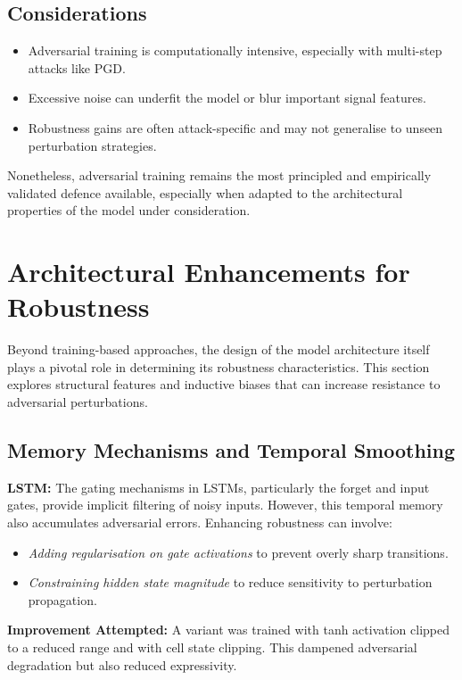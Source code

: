 \subsection{Considerations}

\begin{itemize}
    \item Adversarial training is computationally intensive, especially with multi-step attacks like PGD.
    \item Excessive noise can underfit the model or blur important signal features.
    \item Robustness gains are often attack-specific and may not generalise to unseen perturbation strategies.
\end{itemize}

Nonetheless, adversarial training remains the most principled and empirically validated defence available, especially when adapted to the architectural properties of the model under consideration.

\section{Architectural Enhancements for Robustness}

Beyond training-based approaches, the design of the model architecture itself plays a pivotal role in determining its robustness characteristics. This section explores structural features and inductive biases that can increase resistance to adversarial perturbations.

\subsection{Memory Mechanisms and Temporal Smoothing}

\textbf{LSTM:} The gating mechanisms in LSTMs, particularly the forget and input gates, provide implicit filtering of noisy inputs. However, this temporal memory also accumulates adversarial errors. Enhancing robustness can involve:
\begin{itemize}
    \item \textit{Adding regularisation on gate activations} to prevent overly sharp transitions.
    \item \textit{Constraining hidden state magnitude} to reduce sensitivity to perturbation propagation.
\end{itemize}

\textbf{Improvement Attempted:} A variant was trained with tanh activation clipped to a reduced range and with cell state clipping. This dampened adversarial degradation but also reduced expressivity.

